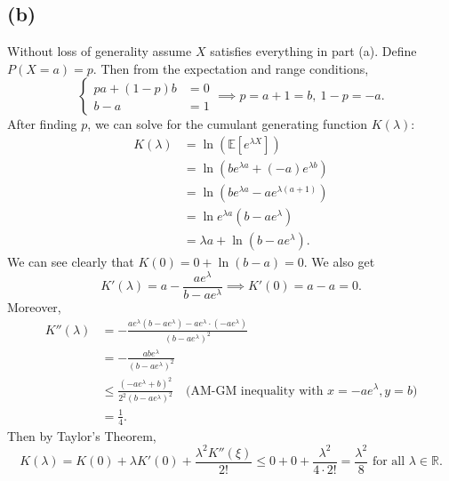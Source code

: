 \subsection*{(b)}
Without loss of generality assume $X$ satisfies everything in part (a). Define $P(X = a) = p$. Then 
from the expectation and range conditions, 
\[ \begin{cases}
	pa + (1 - p)b &= 0 \\
	b - a &= 1
\end{cases} \implies p = a + 1 = b, \ 1 - p = -a. \]
After finding $p$, we can solve for the cumulant generating function $K(\lambda)$: 
\begin{align*}
	K(\lambda) 
	&= \ln{(\mathbb{E}[e^{\lambda X}])} \\
	&= \ln{(be^{\lambda a} + (-a)e^{\lambda b})} \\
	&= \ln{(be^{\lambda a} - ae^{\lambda(a + 1)})} \\
	&= \ln{e^{\lambda a}(b - ae^\lambda)} \\
	&= \lambda a + \ln{(b - ae^\lambda)}.
\end{align*}
We can see clearly that $K(0) = 0 + \ln{(b - a)} = 0$. We also get 
\[ K'(\lambda) = a - \frac{ae^\lambda}{b - ae^\lambda} \implies K'(0) = a - a = 0. \]
Moreover, 
\begin{align*}
	K''(\lambda) 
	&= -\frac{ae^\lambda (b - ae^\lambda) - ae^\lambda \cdot (-ae^\lambda)}{(b - ae^\lambda)^2} \\
	&= -\frac{abe^\lambda}{(b - ae^\lambda)^2} \\
	&\leq \frac{(-ae^\lambda + b)^2}{2^2 (b - ae^\lambda)^2} \quad \text{(AM-GM inequality with } 
	x = -ae^\lambda, y = b) \\
	&= \frac{1}{4}.
\end{align*}
Then by Taylor's Theorem, 
\[ K(\lambda) 
= K(0) + \lambda K'(0) + \frac{\lambda^2 K''(\xi)}{2!} 
\leq 0 + 0 + \frac{\lambda^2}{4 \cdot 2!} = \frac{\lambda^2}{8} \text{ for all } \lambda \in \mathbb{R}. \]

